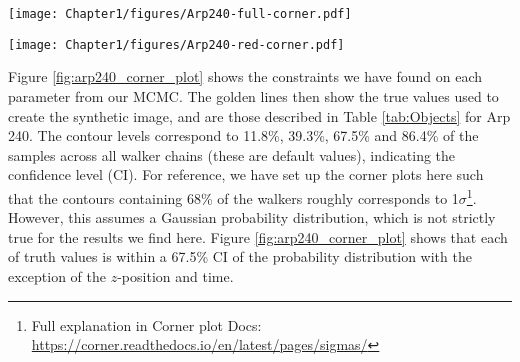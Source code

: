 \begin{figure*}
\centering
\texttt{[image: Chapter1/figures/Arp240-full-corner.pdf]}
\caption[Corner plot showing the constraints made on all thirteen parameters we are exploring.]{Corner plot showing the constraints made on all thirteen parameters we are exploring. Each contour level contains 11.8\%, 39.3\%, 67.5\% and 86.4\% of the samples across all walker chains. \DIFaddbeginFL {}\DIFaddendFL Displaying our results using the full corner plot is difficult in a paper because of the high dimensional results that we obtain. Therefore, we elect to show all remaining results in this paper as reduced corner plots like Figure \ref{fig:arp240_corner_plot}. We elect to put the parameters which are most likely to correlate together in different corner plots.\DIFdelbeginFL {}\DIFdelendFL }
\label{fig:corner_plot}
\end{figure*}

\begin{figure*}
\centering
\texttt{[image: Chapter1/figures/Arp240-red-corner.pdf]}
\caption[Same as Figure \ref{fig:corner_plot}, but reduced to only corresponding parameters.]{Same as Figure \ref{fig:corner_plot}, but reduced to only corresponding parameters. \DIFaddbeginFL {}\DIFaddendFL }
\label{fig:arp240_corner_plot}
\end{figure*}

Figure \ref{fig:arp240_corner_plot} shows the constraints we have found on each parameter from our MCMC. The golden lines then show the true values used to create the synthetic image, and are those described in Table \ref{tab:Objects} for Arp 240. The contour levels correspond to 11.8\%, 39.3\%, 67.5\% and 86.4\% of the samples across all walker chains (these are default values), indicating the confidence level (CI). For reference, we have set up the corner plots here such that the contours containing 68\% of the walkers roughly corresponds to 1$\sigma$\footnote{Full explanation in Corner plot Docs: \url{https://corner.readthedocs.io/en/latest/pages/sigmas/}}. However, this assumes a Gaussian probability distribution, which is not strictly true for the results we find here. \DIFaddbegin {}\DIFaddend Figure \ref{fig:arp240_corner_plot} shows that each of \DIFdelbegin {}\DIFdelend \DIFaddbegin {}\DIFaddend truth values is within a 67.5\% CI of the probability distribution with the exception of the $z$-position and time.

